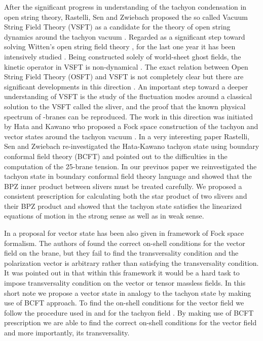 \documentclass[a4paper,12pt]{article}
\begin{document}
After the significant progress in understanding of the tachyon condensation
in open string theory, Rastelli, Sen and Zwiebach proposed the so called
Vacuum String Field Theory (VSFT) as a candidate for the theory of open string
dynamics around the tachyon vacuum \cite{rsz1}. Regarded as a significant step
toward solving Witten's open string field theory \cite{w}, for the last one 
year it has been intensively studied \cite{rsz2,gt1,gt2,mt,rsz5,rsz3}. 
Being constructed solely of world-sheet ghost fields, the kinetic operator 
\coordHE{}
in VSFT  is non-dynamical \cite{rsz}. The exact relation between Open
String Field Theory (OSFT) and VSFT is not completely clear but there are 
significant developments in this direction \cite{mt,grsz,ki-oh,ok}. 
An important step toward a deeper understanding of VSFT is the study of the
fluctuation modes around  a classical solution to the VSFT called 
the sliver, and
the proof that the known physical spectrum of \coordHE{}-branes can be reproduced.
The work in this direction was initiated by Hata and Kawano who proposed a
Fock space construction of the tachyon and vector states around the
tachyon vacuum \cite{hk,hm}. In a very interesting paper \cite{rsz4} 
Rastelli, Sen and Zwiebach re-investigated the Hata-Kawano tachyon 
state using boundary conformal field theory (BCFT) and pointed out to 
the difficulties in the computation of the \coordHE{}25-brane tension.  In 
our previuos paper \cite{rv} we reinvestigated the tachyon state in 
boundary conformal field theory language and showed that the BPZ inner 
product between slivers must be treated carefully.  We proposed a 
consistent prescription for calculating both the star product of two 
slivers and their BPZ product and showed that the tachyon state 
satisfies the linearized equations of motion in the strong sense as 
well as in weak sense.

In \cite{hk} a proposal for vector state has been also given in framework of
Fock space formalism. The authors of \cite{hk} found the correct on-shell
conditions for the vector field on the brane, but they fail to find the
transversality condition and the polarization vector is arbitrary
rather than satisfying the transversality condition. It was pointed out in 
\cite{ki-oh} that within this framework it would be a hard task
to impose transversality condition on the vector or tensor massless fields. 
In this short note we propose a vector state in analogy to the tachyon state 
by making use of BCFT approach. To find the on-shell conditions for the vector 
field \coordHE{} we follow the procedure used in \cite{rsz4} and \cite{rv}
for the tachyon field \coordHE{}. By making use of BCFT prescription
we are able to find the correct on-shell conditions for the vector field and
more importantly, its transversality.
\end{document}
